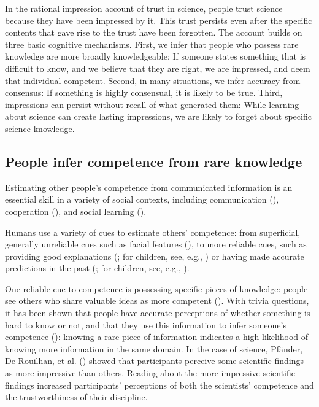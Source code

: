 \documentclass[
  jou,
  floatsintext,
  longtable,
  nolmodern,
  notxfonts,
  notimes,
  colorlinks=true,linkcolor=blue,citecolor=blue,urlcolor=blue]{apa7}
\begin{document}
In the rational impression account of trust in science, people trust
science because they have been impressed by it. This trust persists even
after the specific contents that gave rise to the trust have been
forgotten. The account builds on three basic cognitive mechanisms.
First, we infer that people who possess rare knowledge are more broadly
knowledgeable: If someone states something that is difficult to know,
and we believe that they are right, we are impressed, and deem that
individual competent. Second, in many situations, we infer accuracy from
consensus: If something is highly consensual, it is likely to be true.
Third, impressions can persist without recall of what generated them:
While learning about science can create lasting impressions, we are
likely to forget about specific science knowledge.

\subsection{People infer competence from rare
knowledge}\label{people-infer-competence-from-rare-knowledge}

Estimating other people's competence from communicated information is an
essential skill in a variety of social contexts, including communication
(),
cooperation (), and social learning
().

Humans use a variety of cues to estimate others' competence: from
superficial, generally unreliable cues such as facial features
(), to more reliable cues, such as providing good explanations
(;
for children, see, e.g.,
) or having made accurate predictions in the past
(; for children, see, e.g.,
).

One reliable cue to competence is possessing specific pieces of
knowledge: people see others who share valuable ideas as more competent
(). With trivia
questions, it has been shown that people have accurate perceptions of
whether something is hard to know or not, and that they use this
information to infer someone's competence
():
knowing a rare piece of information indicates a high likelihood of
knowing more information in the same domain. In the case of science,
Pfänder, De Rouilhan, et al.
() showed
that participants perceive some scientific findings as more impressive
than others. Reading about the more impressive scientific findings
increased participants' perceptions of both the scientists' competence
and the trustworthiness of their discipline.
\end{document}
